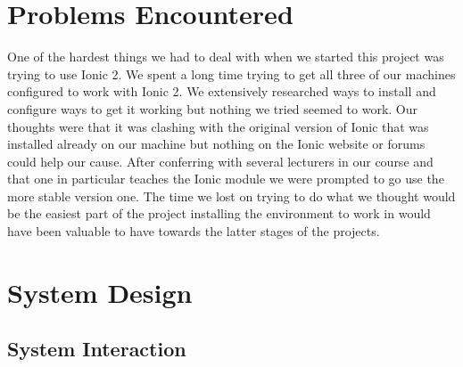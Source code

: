 \section{Problems Encountered}
One of the hardest things we had to deal with when we started this project was trying to use Ionic 2. We spent a long time trying to get all three of our machines configured to work with Ionic 2. We extensively researched ways to install and configure ways to get it working but nothing we tried seemed to work. Our thoughts were that it was clashing with the original version of Ionic that was installed already on our machine but nothing on the Ionic website or forums could help our cause. After conferring with several lecturers in our course and that one in particular teaches the Ionic module we were prompted to go use the more stable version one. The time we lost on trying to do what we thought would be the easiest part of the project installing the environment to work in would have been valuable to have towards the latter stages of the projects.

\section{System Design}

\subsection{System Interaction}
